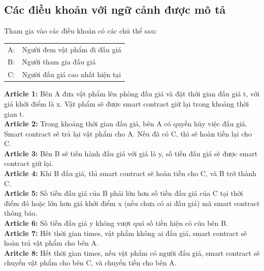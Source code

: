 \documentclass[a4paper]{article}
\begin{document}
\subsection{Các điều khoản với ngữ cảnh được mô tả}
\label{dieukhoan}
Tham gia vào các điều khoản có các chủ thể sau:\\
\begin{center}
    \begin{tabular}{ll}
         A: &  Người đem vật phẩm đi đấu giá\\
         B: &  Người tham gia đấu giá\\
         C: &  Người đấu giá cao nhất hiện tại\\
    \end{tabular}
\end{center}
\textbf{Article 1:} Bên A đưa vật phẩm lên phòng đấu giá và đặt thời gian đấu giá t, với giá khởi điểm là x. Vật phẩm sẽ được smart contract giữ lại trong khoảng thời gian t.\\
\textbf{Article 2:} Trong khoảng thời gian đấu giá, bên A có quyền hủy việc đấu giá. Smart contract sẽ trả lại vật phẩm cho A. Nếu đã có C, thì sẽ hoàn tiền lại cho C.\\
\textbf{Article 3:} Bên B sẽ tiến hành đấu giá với giá là y, số tiền đấu giá sẽ được smart contract giữ lại.\\
\textbf{Article 4:}  Khi B đấu giá, thì smart contract sẽ hoàn tiền cho C, và B trở thành C.\\
\textbf{Article 5:} Số tiền đấu giá của B phải lớn hơn số tiền đấu giá của C tại thời điểm đó hoặc lớn hơn giá khởi điểm x (nếu chưa có ai đấu giá) mà smart contract thông báo.\\
\textbf{Article 6:} Số tiền đấu giá y không vượt quá số tiền hiện có của bên B.  \\
\textbf{Article 7:} Hết thời gian times, vật phẩm không ai đấu giá, smart contract sẽ hoàn trả vật phẩm cho bên A.\\
\textbf{Aritcle 8:} Hết thời gian times, nếu vật phẩm có người đấu giá, smart contract sẽ chuyển vật phẩm cho bên C, và chuyển tiền cho bên A.\\
\end{document}
